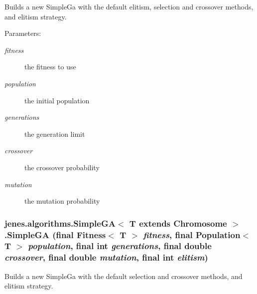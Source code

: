 Builds a new SimpleGa with the default elitism, selection and crossover methods, and elitism strategy.

\begin{Desc}
\item[Parameters:]
\begin{description}
\item[{\em fitness}]the fitness to use \item[{\em population}]the initial population \item[{\em generations}]the generation limit \item[{\em crossover}]the crossover probability \item[{\em mutation}]the mutation probability \end{description}
\end{Desc}
\hypertarget{classjenes_1_1algorithms_1_1_simple_g_a_3_01_t_01extends_01_chromosome_01_4_e4d2d54f7d376688e0ab0eabfa85a7e2}{
\subsubsection[SimpleGA]{\setlength{\rightskip}{0pt plus 5cm}jenes.algorithms.SimpleGA$<$ T extends Chromosome $>$.SimpleGA (final Fitness$<$ T $>$ {\em fitness}, \/  final Population$<$ T $>$ {\em population}, \/  final int {\em generations}, \/  final double {\em crossover}, \/  final double {\em mutation}, \/  final int {\em elitism})}}
\label{classjenes_1_1algorithms_1_1_simple_g_a_3_01_t_01extends_01_chromosome_01_4_e4d2d54f7d376688e0ab0eabfa85a7e2}


Builds a new SimpleGa with the default selection and crossover methods, and elitism strategy.


